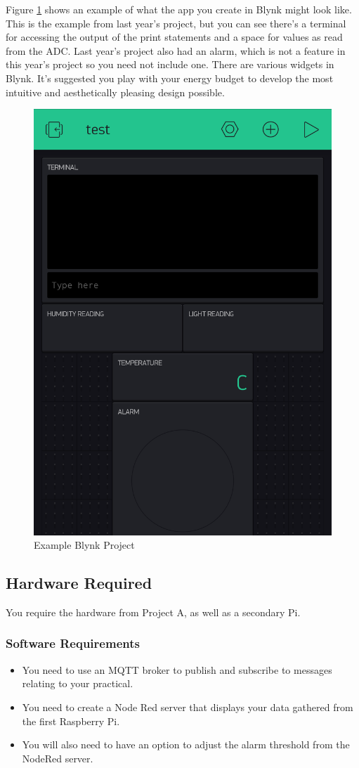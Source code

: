 \begin{multicols}{2}
Figure \ref{fig:blynkexample} shows an example of what the app you create in Blynk might look like. This is the example from last year's project, but you can see there's a terminal for accessing the output of the print statements and a space for values as read from the ADC. Last year's project also had an alarm, which is not a feature in this year's project so you need not include one. There are various widgets in Blynk. It's suggested you play with your energy budget to develop the most intuitive and aesthetically pleasing design possible.
\vfill\null
\columnbreak
\begin{figure}[H]
\centering
\includegraphics[width=0.75\columnwidth]{Figures/blynkexample}
\caption{Example Blynk Project}
\label{fig:blynkexample}
\end{figure}
\end{multicols}

\subsection{Hardware Required}
You require the hardware from Project A, as well as a secondary Pi.

\subsubsection{Software Requirements}
\begin{itemize}
    \item You need to use an MQTT broker to publish and subscribe to messages relating to your practical. 
    \item You need to create a Node Red server that displays your data gathered from the first Raspberry Pi. 
    \item You will also need to have an option to adjust the alarm threshold from the NodeRed server.
\end{itemize}

